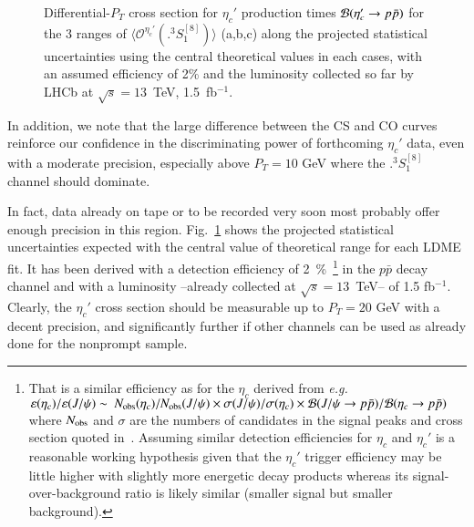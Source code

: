 \documentclass[showpacs,aps,PRL,twocolumn,footinbib,11]{revtex4-1}
\def\eg{{\it e.g.}}
\def\tSoe{{\bigl.^3\!S^{[8]}_1}}
\def\jpsi{J/\psi}
\def\etac{\eta_c}
\def\etacp{\eta_c'}
\def\coetacp{{\langle\mathcal{O}^{\etacp}(\bigl.^3\! S_1^{[8]})\rangle}}
\newcommand{\cf}[1]{{Fig.~\ref{#1}}}
\begin{document}
\begin{figure*}[hbt!]
\centering
{}
\caption{Differential-$P_T$ cross section for $\etacp$ production times ${\cal B}(\etacp \to p \bar p)$ 
for the 3 ranges of $\coetacp$ (a,b,c) along the 
projected statistical uncertainties using the central theoretical values in each cases, with
an assumed efficiency of 2\% and the luminosity collected so far by LHCb at $\sqrt{s}=13$~TeV, 1.5~fb$^{-1}$.
\label{fig:3-CO}}
\end{figure*}

In addition, we note that the large difference between the CS and CO curves reinforce our confidence
in the discriminating power of forthcoming $\etacp$ data, even with a moderate precision, especially above $P_T=10$ GeV where 
the $\tSoe$ channel should dominate. %

In fact, data already on tape or to be recorded very soon most probably offer enough precision in this region.
\cf{fig:3-CO} shows the projected statistical uncertainties expected
with the central value of theoretical range for each LDME fit. It has been 
derived with a detection efficiency of 2~\%~\footnote{That is a similar efficiency as
for the $\eta_c$ derived from \eg\ 
$\varepsilon(\etac) / \varepsilon(\jpsi) \sim ~ N_{\rm obs}(\etac)/N_{\rm obs}(\jpsi) \times 
\sigma(\jpsi)/\sigma(\etac) \times {\cal B}(\jpsi \to p\bar p)/{\cal B}(\etac \to p\bar p)$ where
$N_{\rm obs}$ and $\sigma$ are the numbers of candidates in the signal peaks and cross section
quoted in~\cite{Aaij:2014bga}. Assuming similar detection efficiencies for $\etac$ and $\etacp$ is a reasonable working hypothesis given that the $\etacp$ trigger efficiency may be little higher with slightly more energetic decay products
whereas its signal-over-background ratio is likely similar (smaller signal but smaller background).} in the $p\bar p$ decay channel
and with a luminosity --already collected at $\sqrt{s}=13$~TeV-- of 1.5 fb$^{-1}$.
Clearly, the $\etacp$ cross section should be measurable up to $P_T=20$ GeV with a decent precision, and significantly further if other channels can be used as already done for the nonprompt sample.
\end{document}
